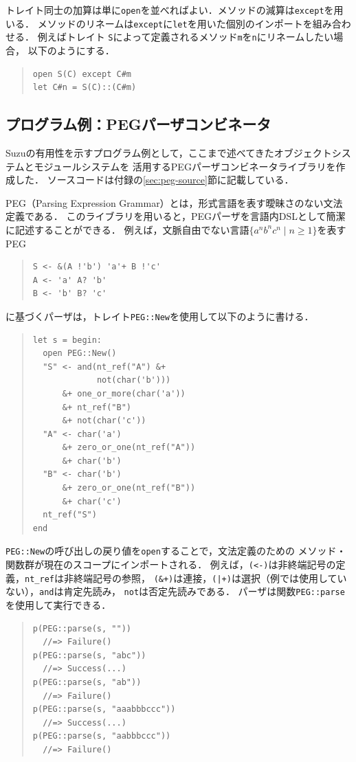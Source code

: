 \documentclass{ipsjprosym}
\begin{document}
トレイト同士の加算は単に\verb|open|を並べればよい．メソッドの減算は\verb|except|を用いる．
メソッドのリネームは\verb|except|に\verb|let|を用いた個別のインポートを組み合わせる．
例えばトレイト \verb|S|によって定義されるメソッド\verb|m|を\verb|n|にリネームしたい場合，
以下のようにする．
\begin{quote}
\begin{verbatim}
open S(C) except C#m
let C#n = S(C)::(C#m)
\end{verbatim}
\end{quote}

\subsection{プログラム例：PEGパーザコンビネータ}

Suzuの有用性を示すプログラム例として，ここまで述べてきたオブジェクトシステムとモジュールシステムを
活用するPEGパーザコンビネータライブラリを作成した．
ソースコードは付録の\ref{sec:peg-source}節に記載している．

PEG（Parsing Expression Grammar）とは，形式言語を表す曖昧さのない文法定義である．
このライブラリを用いると，PEGパーザを言語内DSLとして簡潔に記述することができる．
例えば，文脈自由でない言語$\{a^n b^n c^n \mid n \ge 1\}$を表すPEG
\begin{quote}
\begin{verbatim}
S <- &(A !'b') 'a'+ B !'c'
A <- 'a' A? 'b'
B <- 'b' B? 'c'
\end{verbatim}
\end{quote}
に基づくパーザは，トレイト\verb|PEG::New|を使用して以下のように書ける．
\begin{quote}
\begin{verbatim}
let s = begin:
  open PEG::New()
  "S" <- and(nt_ref("A") &+
             not(char('b')))
      &+ one_or_more(char('a'))
      &+ nt_ref("B")
      &+ not(char('c'))
  "A" <- char('a')
      &+ zero_or_one(nt_ref("A"))
      &+ char('b')
  "B" <- char('b')
      &+ zero_or_one(nt_ref("B"))
      &+ char('c')
  nt_ref("S")
end
\end{verbatim}
\end{quote}
\verb|PEG::New|の呼び出しの戻り値を\verb|open|することで，文法定義のための
メソッド・関数群が現在のスコープにインポートされる．
例えば，\verb|(<-)|は非終端記号の定義，\verb|nt_ref|は非終端記号の参照，
\verb|(&+)|は連接，\verb/(|+)/は選択（例では使用していない），\verb|and|は肯定先読み，
\verb|not|は否定先読みである．
パーザは関数\verb|PEG::parse|を使用して実行できる．
\begin{quote}
\begin{verbatim}
p(PEG::parse(s, ""))
  //=> Failure()
p(PEG::parse(s, "abc"))
  //=> Success(...)
p(PEG::parse(s, "ab"))
  //=> Failure()
p(PEG::parse(s, "aaabbbccc"))
  //=> Success(...)
p(PEG::parse(s, "aabbbccc"))
  //=> Failure()
\end{verbatim}
\end{quote}
\end{document}
